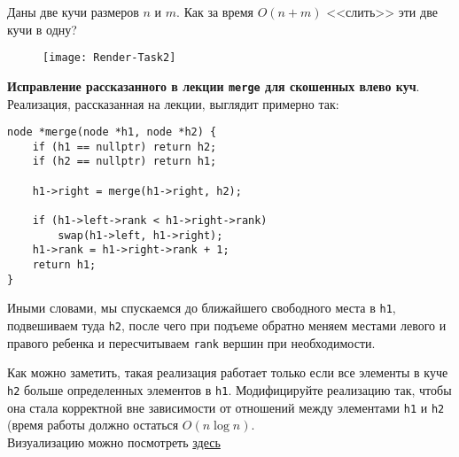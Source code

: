 \begin{problem}
    Даны две кучи размеров $n$ и $m$. Как за время $O(n + m)$ <<слить>> эти две кучи в одну?
\end{problem}

\begin{solution}
    \medskip\noindent

    \begin{figure}[!ht]
        \texttt{[image: Render-Task2]}
    \end{figure}
\end{solution}


\begin{problem}
    \textbf{Исправление рассказанного в лекции \texttt{merge} для скошенных влево куч}.
    Реализация, рассказанная на лекции, выглядит примерно так:

    {
        \normalfont\begin{lstlisting}
node *merge(node *h1, node *h2) {
    if (h1 == nullptr) return h2;
    if (h2 == nullptr) return h1;

    h1->right = merge(h1->right, h2);

    if (h1->left->rank < h1->right->rank)
        swap(h1->left, h1->right);
    h1->rank = h1->right->rank + 1;
    return h1;
}
        \end{lstlisting}
    }

    Иными словами, мы спускаемся до ближайшего свободного места в \texttt{h1}, подвешиваем туда \texttt{h2}, после чего
    при подъеме обратно меняем местами левого и правого ребенка и пересчитываем \texttt{rank} вершин при необходимости.

    Как можно заметить, такая реализация работает только если все элементы в куче \texttt{h2} больше определенных
    элементов в \texttt{h1}. Модифицируйте реализацию так, чтобы она стала корректной вне зависимости от отношений
    между элементами \texttt{h1} и \texttt{h2} (время работы должно остаться $O(n \log n)$. \\
    {\footnotesize Визуализацию можно посмотреть \href{https://www.cs.usfca.edu/~galles/visualization/LeftistHeap.html}{здесь}}
\end{problem}

